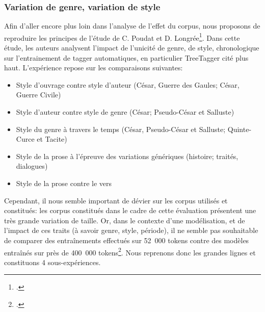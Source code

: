 \subsubsection{Variation de genre, variation de style}
\label{lemmatisation:extensibilite:prose-vers}

Afin d'aller encore plus loin dans l'analyse de l'effet du corpus, nous proposons de reproduire les principes de l'étude de C. Poudat et D. Longrée\footcite{poudat2009variations}. Dans cette étude, les auteurs analysent l'impact de l'unicité de genre, de style, chronologique sur l'entrainement de tagger automatiques, en particulier TreeTagger cité plus haut. L'expérience repose sur les comparaisons suivantes:
\begin{itemize}
    \item Style d'ouvrage contre style d'auteur (César, Guerre des Gaules; César, Guerre Civile)
    \item Style d'auteur contre style de genre (César; Pseudo-César et Salluste)
    \item Style du genre à travers le temps (César, Pseudo-César et Salluste; Quinte-Curce et Tacite)
    \item Style de la prose à l'épreuve des variations génériques (histoire; traités, dialogues)
    \item Style de la prose contre le vers
\end{itemize}{}

Cependant, il nous semble important de dévier sur les corpus utilisés et constitués: les corpus constitués dans le cadre de cette évaluation présentent une très grande variation de taille. Or, dans le contexte d'une modélisation, et de l'impact de ces traits (à savoir genre, style, période), il ne semble pas souhaitable de comparer des entraînements effectués sur 52~000 tokens contre des modèles entraînés sur près de 400~000 tokens\footcite[par exemple, p.~135, 2.~2.~4]{poudat2009variations}. Nous reprenons donc les grandes lignes et constituons 4 sous-expériences.

